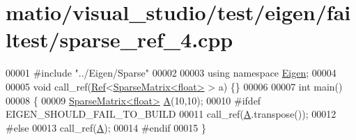 \hypertarget{matio_2visual__studio_2test_2eigen_2failtest_2sparse__ref__4_8cpp_source}{}\section{matio/visual\+\_\+studio/test/eigen/failtest/sparse\+\_\+ref\+\_\+4.cpp}
\label{matio_2visual__studio_2test_2eigen_2failtest_2sparse__ref__4_8cpp_source}

\begin{DoxyCode}
00001 \textcolor{preprocessor}{#include "../Eigen/Sparse"}
00002 
00003 \textcolor{keyword}{using namespace }\hyperlink{namespace_eigen}{Eigen};
00004 
00005 \textcolor{keywordtype}{void} call\_ref(\hyperlink{group___core___module_class_eigen_1_1_ref}{Ref}<\hyperlink{group___sparse_core___module_class_eigen_1_1_sparse_matrix}{SparseMatrix<float>} > a) \{\}
00006 
00007 \textcolor{keywordtype}{int} main()
00008 \{
00009   \hyperlink{group___sparse_core___module_class_eigen_1_1_sparse_matrix}{SparseMatrix<float>} \hyperlink{group___core___module_class_eigen_1_1_matrix}{A}(10,10);
00010 \textcolor{preprocessor}{#ifdef EIGEN\_SHOULD\_FAIL\_TO\_BUILD}
00011   call\_ref(\hyperlink{group___core___module_class_eigen_1_1_matrix}{A}.transpose());
00012 \textcolor{preprocessor}{#else}
00013   call\_ref(\hyperlink{group___core___module_class_eigen_1_1_matrix}{A});
00014 \textcolor{preprocessor}{#endif}
00015 \}
\end{DoxyCode}
